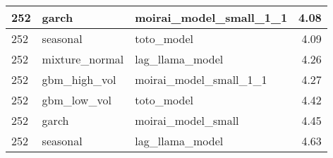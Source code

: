 {\begin{tabular}{lllr}
\midrule
252 & garch & moirai\_model\_small\_1\_1 & 4.08 \\
\midrule
252 & seasonal & toto\_model & 4.09 \\
\midrule
252 & mixture\_normal & lag\_llama\_model & 4.26 \\
\midrule
252 & gbm\_high\_vol & moirai\_model\_small\_1\_1 & 4.27 \\
\midrule
252 & gbm\_low\_vol & toto\_model & 4.42 \\
\midrule
252 & garch & moirai\_model\_small & 4.45 \\
\midrule
252 & seasonal & lag\_llama\_model & 4.63 \\
\bottomrule
\end{tabular}
}